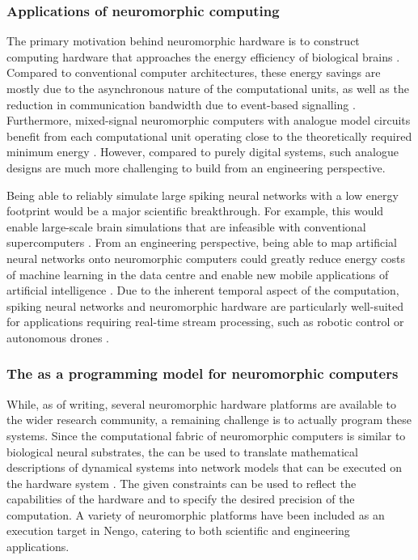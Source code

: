 \subsubsection{Applications of neuromorphic computing}
The primary motivation behind neuromorphic hardware is to construct computing hardware that approaches the energy efficiency of biological brains \citep{mead1990neuromorphic,boahen2017neuromorph}.
Compared to conventional computer architectures, these energy savings are mostly due to the asynchronous nature of the computational units, as well as the reduction in communication bandwidth due to event-based signalling \citep{painkras2013spinnaker}.
Furthermore, mixed-signal neuromorphic computers with analogue model circuits benefit from each computational unit operating close to the theoretically required minimum energy \citep{boahen2017neuromorph}.
However, compared to purely digital systems, such analogue designs are much more challenging to build from an engineering perspective.

Being able to reliably simulate large spiking neural networks with a low energy footprint would be a major scientific breakthrough.
For example, this would enable large-scale brain simulations that are infeasible with conventional supercomputers \citep{calimera2013human}.
From an engineering perspective, being able to map artificial neural networks onto neuromorphic computers could greatly reduce energy costs of machine learning in the data centre and enable new mobile applications of artificial intelligence \citep{hunsberger2016training,blouw2018benchmarking,goltz2021fast,blouw2020eventdriven}.
Due to the inherent temporal aspect of the computation, spiking neural networks and neuromorphic hardware are particularly well-suited for applications requiring real-time stream processing, such as robotic control or autonomous drones \citep{komer2015biologically,yan2021comparing}.

\subsubsection{The \NEF as a programming model for neuromorphic computers}
While, as of writing, several neuromorphic hardware platforms are available to the wider research community, a remaining challenge is to actually program these systems.
Since the computational fabric of neuromorphic computers is similar to biological neural substrates, the \NEF can be used to translate mathematical descriptions of dynamical systems into network models that can be executed on the hardware system \citep{boahen2017neuromorph}.
The given constraints can be used to reflect the capabilities of the hardware and to specify the desired precision of the computation.
A variety of neuromorphic platforms have been included as an execution target in Nengo, catering to both scientific and engineering applications.

